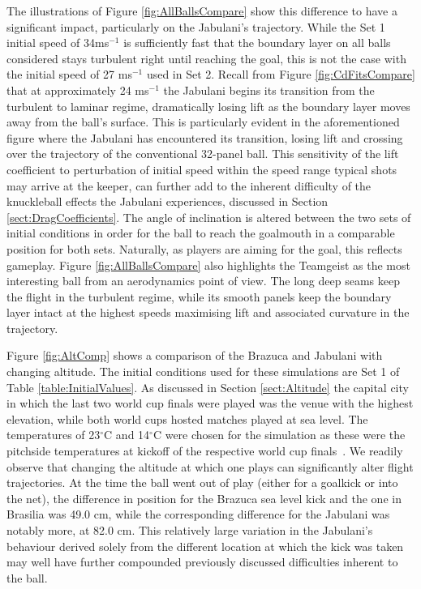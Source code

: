 \documentclass[a4paper]{article}
\begin{document}
The illustrations of Figure \ref{fig:AllBallsCompare} show this difference to have a significant impact, particularly on the Jabulani's trajectory.  While the Set 1 initial speed of 34ms$^{-1}$ is sufficiently fast that the boundary layer on all balls considered stays turbulent right until reaching the goal, this is not the case with the initial speed of 27 ms$^{-1}$ used in Set 2.  Recall from Figure \ref{fig:CdFitsCompare} that at approximately 24 ms$^{-1}$ the Jabulani begins its transition from the turbulent to laminar regime, dramatically losing lift as the boundary layer moves away from the ball's surface.  This is particularly evident in the aforementioned figure where the Jabulani has encountered its transition, losing lift and crossing over the trajectory of the conventional 32-panel ball.  This sensitivity of the lift coefficient to perturbation of initial speed within the speed range typical shots may arrive at the keeper, can further add to the inherent difficulty of the knuckleball effects the Jabulani experiences, discussed in Section \ref{sect:DragCoefficients}.
The angle of inclination is altered between the two sets of initial conditions in order for the ball to reach the goalmouth in a comparable position for both sets.  Naturally, as players are aiming for the goal, this reflects gameplay.  Figure \ref{fig:AllBallsCompare} also highlights the Teamgeist as the most interesting ball from an aerodynamics point of view.  The long deep seams keep the flight in the turbulent regime, while its smooth panels keep the boundary layer intact at the highest speeds maximising lift and associated curvature in the trajectory.

Figure \ref{fig:AltComp} shows a comparison of the Brazuca and Jabulani with changing altitude.  The initial conditions used for these simulations are Set 1 of Table \ref{table:InitialValues}.  As discussed in Section \ref{sect:Altitude} the capital city in which the last two world cup finals were played was the venue with the highest elevation, while both world cups hosted matches played at sea level.  The temperatures of 23$^{\circ}$C and 14$^{\circ}$C were chosen for the simulation as these were the pitchside temperatures at kickoff of the respective world cup finals~\cite{2014FinalInfoFIFA}.  We readily observe that changing the altitude at which one plays can significantly alter flight trajectories.  At the time the ball went out of play (either for a goalkick or into the net), the difference in position for the Brazuca sea level kick and the one in Brasilia was 49.0 cm, while the corresponding difference for the Jabulani was notably more, at 82.0 cm.  This relatively large variation in the Jabulani's behaviour derived solely from the different location at which the kick was taken may well have further compounded previously discussed difficulties inherent to the ball.
\end{document}
